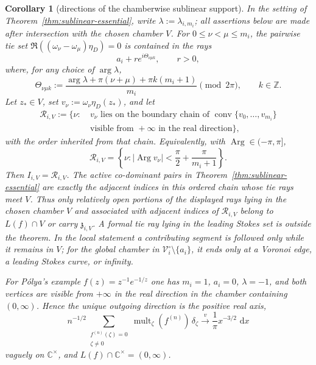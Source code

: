 \documentclass[reqno]{article}
\newtheorem{cor}[theorem]{Corollary}
\theoremstyle{definition}
\theoremstyle{remark}
\theoremstyle{plain}
\newcommand{\C}{\mathbb C}
\newcommand{\dd}{\,\mathrm d}
\begin{document}
\begin{cor}[directions of the chamberwise sublinear support]\label{cor:sublinear-rays}
In the setting of Theorem~\ref{thm:sublinear-essential}, write $\lambda:=\lambda_{i,m_i}$; all assertions below are made after intersection with the chosen chamber $V$. For $0\le\nu<\mu\le m_i$, the pairwise tie set $\Re((\omega_\nu-\omega_\mu)\eta_D)=0$ is contained in the rays
\[
a_i+r e^{i\Theta_{\nu\mu k}},\qquad r>0,
\]
where, for any choice of $\arg\lambda$,
\[
\Theta_{\nu\mu k}:=\frac{\arg\lambda+\pi(\nu+\mu)+\pi k(m_i+1)}{m_i}\pmod{2\pi},\qquad k\in\mathbb Z.
\]
Let $z_\ast\in V$, set $v_\nu:=\omega_\nu\eta_D(z_\ast)$, and let
\[
\begin{aligned}
\mathcal R_{i,V}:=\{\nu:\ &v_\nu\text{ lies on the boundary chain of }
\operatorname{conv}\{v_0,\dots,v_{m_i}\}\\
&\text{visible from }+\infty\text{ in the real direction}\},
\end{aligned}
\]
with the order inherited from that chain. Equivalently, with $\operatorname{Arg}\in(-\pi,\pi]$,
\[
\mathcal R_{i,V}=\left\{\nu:
\left|\operatorname{Arg}v_\nu\right|<\frac\pi2+\frac\pi{m_i+1}\right\}.
\]
Then $I_{i,V}=\mathcal R_{i,V}$. The active co-dominant pairs in Theorem~\ref{thm:sublinear-essential} are exactly the adjacent indices in this ordered chain whose tie rays meet $V$. Thus only relatively open portions of the displayed rays lying in the chosen chamber $V$ and associated with adjacent indices of $\mathcal R_{i,V}$ belong to $L(f)\cap V$ or carry $\mathfrak z_{i,V}$. A formal tie ray lying in the leading Stokes set is outside the theorem. In the local statement a contributing segment is followed only while it remains in $V$; for the global chamber in $\mathcal V_i^\circ\setminus\{a_i\}$, it ends only at a Voronoi edge, a leading Stokes curve, or infinity.

For P\'olya's example $f(z)=z^{-1}e^{-1/z}$ one has $m_i=1$, $a_i=0$, $\lambda=-1$, and both vertices are visible from $+\infty$ in the real direction in the chamber containing $(0,\infty)$. Hence the unique outgoing direction is the positive real axis,
\[
n^{-1/2}\sum_{\substack{f^{(n)}(\zeta)=0\\ \zeta\ne0}}
\operatorname{mult}_\zeta(f^{(n)})\,\delta_\zeta
\xrightarrow{\;v\;}\frac{1}{\pi}x^{-3/2}\,\dd x
\]
vaguely on $\C^\times$, and $L(f)\cap\C^\times=(0,\infty)$.
\end{cor}
\end{document}
